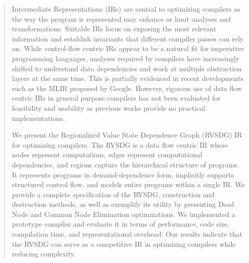 \begin{abstract}
  Intermediate Representations (IRs) are central to optimizing compilers as the
  way the program is represented may enhance or limit analyses and %
  transformations. %
  Suitable IRs focus on exposing the most relevant information and establish
  invariants that different compiler passes can rely on. %
  While control-flow centric IRs appear to be a natural fit for imperative
  programming languages, analyses required by compilers have increasingly
  shifted to understand data dependencies and work at multiple abstraction
	layers at the same time. %
  This is partially evidenced in recent developments such as the MLIR proposed
  by Google. %
  However, rigorous use of data flow centric IRs in general purpose compilers
  has not been evaluated for feasibility and usability as previous works provide
  no practical implementations. %

  We present the Regionalized Value State Dependence Graph (RVSDG) IR for
  optimizing compilers. %
  The RVSDG is a data flow centric IR where nodes represent computations, edges
  represent computational dependencies, and regions capture the hierarchical
  structure of programs. %
  It represents programs in demand-dependence form, implicitly supports
  structured control flow, and models entire programs within a single IR. %
  We provide a complete specification of the RVSDG, construction and destruction
  methods, as well as exemplify its utility by presenting Dead Node and Common
  Node Elimination optimizations. %
  We implemented a prototype compiler and evaluate it in terms of performance,
  code size, compilation time, and representational overhead. %
  Our results indicate that the RVSDG can serve as a competitive IR in
  optimizing compilers while reducing complexity.
\end{abstract}
